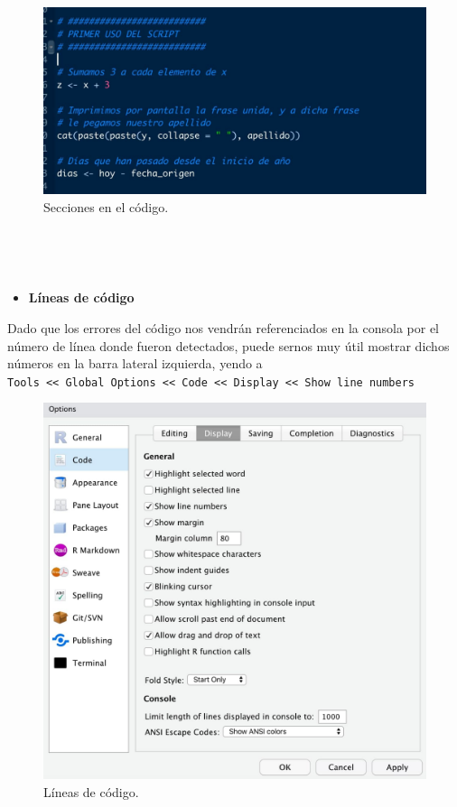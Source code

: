 \documentclass[11pt,]{book}
\providecommand{\tightlist}{%
  \setlength{\itemsep}{0pt}\setlength{\parskip}{0pt}}
\begin{document}
\begin{figure}

{\centering \includegraphics[width=0.5\linewidth]{./img/indice} 

}

\caption{Secciones en el código.}\label{fig:indice}
\end{figure}

~

~

\begin{itemize}
\tightlist
\item
  \textbf{Líneas de código}
\end{itemize}

Dado que los errores del código nos vendrán referenciados en la consola por el número de línea donde fueron detectados, puede sernos muy útil mostrar dichos números en la barra lateral izquierda, yendo a \texttt{Tools\ \textless{}\textless{}\ Global\ Options\ \textless{}\textless{}\ Code\ \textless{}\textless{}\ Display\ \textless{}\textless{}\ Show\ line\ numbers}

\begin{figure}

{\centering \includegraphics[width=0.5\linewidth]{./img/show_line_numbers} 

}

\caption{Líneas de código.}\label{fig:show-line-numbers}
\end{figure}

~

~
\end{document}
